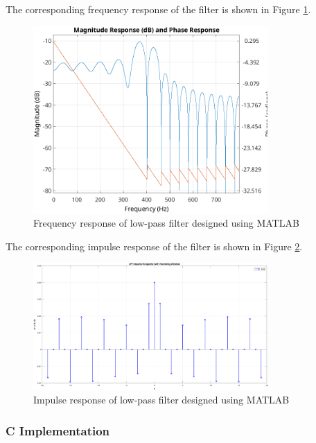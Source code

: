 \documentclass[a4paper,12pt]{article}
\begin{document}


The corresponding frequency response of the filter is shown in Figure \ref{fig:lowpass-freq}.

\begin{figure}[ht]
    \centering
    \includegraphics[width=0.8\textwidth]{./figs/LPF_freq.png}
    \caption{Frequency response of low-pass filter designed using MATLAB}
    \label{fig:lowpass-freq}
\end{figure}

\newpage
The corresponding impulse response of the filter is shown in Figure \ref{fig:lowpass-impulse}.
\begin{figure}[ht]
    \centering
    \includegraphics[width=0.8\textwidth]{./figs/LPF_impulse.png}
    \caption{Impulse response of low-pass filter designed using MATLAB}
    \label{fig:lowpass-impulse}
\end{figure}


\subsubsection*{C Implementation}
\end{document}
